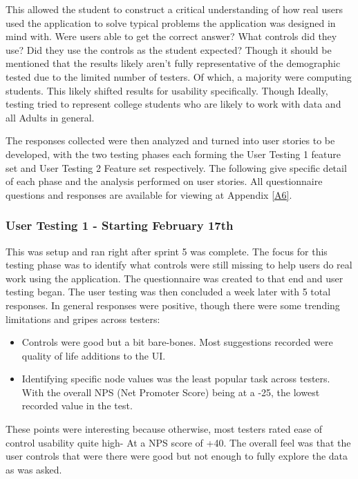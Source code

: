 This allowed the student to construct a critical understanding of how real users used the application to solve typical problems the application was designed in mind with. Were users able to get the correct answer? What controls did they use? Did they use the controls as the student expected? Though it should be mentioned that the results likely aren't fully representative of the demographic tested due to the limited number of testers. Of which, a majority were computing students. This likely shifted results for usability specifically. Though Ideally, testing tried to represent college students who are likely to work with data and all Adults in general.

The responses collected were then analyzed and turned into user stories to be developed, with the two testing phases each forming the User Testing 1 feature set and User Testing 2 Feature set respectively. The following give specific detail of each phase and the analysis performed on user stories. All questionnaire questions and responses are available for viewing at Appendix \ref{A6}.

\subsubsection{User Testing 1 - Starting February 17th} \label{usertestanalysis}
This was setup and ran right after sprint 5 was complete. The focus for this testing phase was to identify what controls were still missing to help users do real work using the application. The questionnaire was created to that end and user testing began. The user testing was then concluded a week later with 5 total responses. In general responses were positive, though there were some trending limitations and gripes across testers:

\begin{itemize}
    \item Controls were good but a bit bare-bones. Most suggestions recorded were quality of life additions to the UI.
    \item Identifying specific node values was the least popular task across testers. With the overall NPS (Net Promoter Score) being at a -25, the lowest recorded value in the test.
\end{itemize}

These points were interesting because otherwise, most testers rated ease of control usability quite high- At a NPS score of +40. The overall feel was that the user controls that were there were good but not enough to fully explore the data as was asked.

